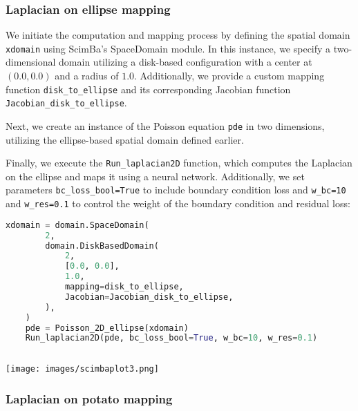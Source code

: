 \documentclass[12pt]{article}
\begin{document}
\subsubsection{Laplacian on ellipse mapping}

We initiate the computation and mapping process by defining the spatial domain \texttt{xdomain} using ScimBa's SpaceDomain module. In this instance, we specify a two-dimensional domain utilizing a disk-based configuration with a center at $(0.0, 0.0)$ and a radius of $1.0$. Additionally, we provide a custom mapping function \texttt{disk\_to\_ellipse} and its corresponding Jacobian function \texttt{Jacobian\_disk\_to\_ellipse}.

Next, we create an instance of the Poisson equation \texttt{pde} in two dimensions, utilizing the ellipse-based spatial domain defined earlier.

Finally, we execute the \texttt{Run\_laplacian2D} function, which computes the Laplacian on the ellipse and maps it using a neural network. Additionally, we set parameters \texttt{bc\_loss\_bool=True} to include boundary condition loss and \texttt{w\_bc=10} and \texttt{w\_res=0.1} to control the weight of the boundary condition and residual loss:
\newpage

\begin{lstlisting}[language=Python,caption={},frame=single, backgroundcolor=\color{gray!10}, basicstyle=\footnotesize,rulecolor=\color{blue}, framexleftmargin=3pt, commentstyle=\color{mygreen}, keywordstyle=\color{blue}]
    xdomain = domain.SpaceDomain(
        2,
        domain.DiskBasedDomain(
            2,
            [0.0, 0.0],
            1.0,
            mapping=disk_to_ellipse,
            Jacobian=Jacobian_disk_to_ellipse,
        ),
    )
    pde = Poisson_2D_ellipse(xdomain)
    Run_laplacian2D(pde, bc_loss_bool=True, w_bc=10, w_res=0.1)
    
\end{lstlisting}
\begin{frame}{}
    \begin{center}
        \texttt{[image: images/scimbaplot3.png]}
        \end{center}
\end{frame}

\subsubsection{Laplacian on potato mapping}
\end{document}
